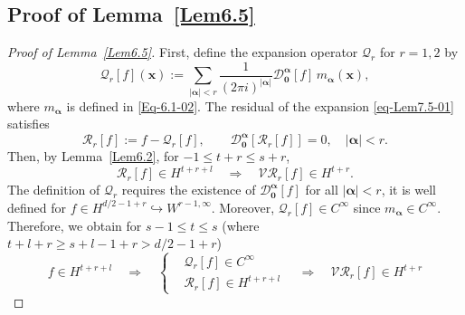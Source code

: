 \documentclass{sn-jnl}%
\numberwithin{equation}{section}
\theoremstyle{thmstyleone}%
\theoremstyle{thmstyletwo}%
\theoremstyle{thmstylethree}%
\begin{document}
\begin{appendices}
\section{Proof of Lemma~\ref{Lem6.5}}\label{proofLem6.5}
\begin{proof}[Proof of Lemma~\ref{Lem6.5}]
First, define the expansion operator $\mathcal{Q}_r$ for $r=1,2$ by
\begin{equation}\label{eq-Lem7.5-01}
\mathcal{Q}_{r}[f](\bm x)
:=
\sum_{|\bm \alpha|< r}
\frac{1}{(2\pi i)^{|\bm \alpha|}}
\mathcal{D}^{\bm \alpha}_{\bm 0}[f]\,
m_{\bm \alpha}(\bm x),
\end{equation}
where $m_{\bm \alpha}$ is defined in \eqref{Eq-6.1-02}. The residual of the expansion \eqref{eq-Lem7.5-01} satisfies 
\begin{equation}\label{eq-Lem7.5-02}
\mathcal{R}_r[f]
:=
f-\mathcal{Q}_r[f],
\qquad
\mathcal{D}^{\bm \alpha}_{\bm 0}\!\left[\mathcal{R}_r[f]\right]=0,
\quad
|\bm \alpha|<r.
\end{equation}
Then, by Lemma~\ref{Lem6.2}, for $-1\leq t+r\leq s+r$,
\begin{equation}\label{eq-Lem7.5-03}
\mathcal{R}_r[f]\in H^{t+r+l}
\quad\Longrightarrow\quad
\mathcal{V}\mathcal{R}_r[f]\in H^{t+r}.
\end{equation}
The definition of $\mathcal{Q}_r$ requires the existence of
$\mathcal{D}^{\bm \alpha}_{\bm 0}[f]$ for all $|\bm \alpha|<r$, it is well defined for
$f\in H^{d/2-1+r}\hookrightarrow W^{r-1,\infty}$. Moreover, $\mathcal{Q}_r[f]\in C^{\infty}$ since $m_{\bm \alpha}\in C^{\infty}$. 
Therefore, we obtain for $s-1\leq t\leq s$ (where $t+l+r\geq s+l-1+r>d/2-1+r$)
\begin{equation}\label{eq-Lem7.5-04}
    f \in H^{t+r+l} 
    \quad \Longrightarrow\quad 
    \left\{
    \begin{aligned}
    &\mathcal{Q}_r[f] \in C^{\infty}\\
    &\mathcal{R}_r[f] \in H^{t+r+l}   
    \end{aligned}
    \right.
    \quad \Longrightarrow\quad 
    \mathcal{V}\mathcal{R}_r[f] \in H^{t+r}
\end{equation}


\end{proof}
\end{appendices}
\end{document}
